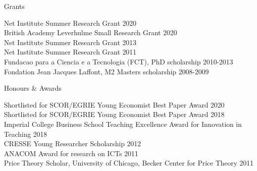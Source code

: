 \documentclass{resume}
\begin{document}


\begin{rSection}{Grants}

Net Institute Summer Research Grant \hfill {2020}
\\ British Academy Leverhulme Small Research Grant \hfill 2020
\\ Net Institute Summer Research Grant \hfill {2013}
\\ Net Institute Summer Research Grant \hfill {2011}
\\ Fundacao para a Ciencia e a Tecnologia (FCT), PhD scholarship \hfill {2010-2013}
\\ Fondation Jean Jacques Laffont, M2 Masters scholarship \hfill 2008-2009

\end{rSection}



\begin{rSection}{Honours \& Awards}

Shortlisted for SCOR/EGRIE Young Economist Best Paper Award \hfill 2020
\\ Shortlisted for SCOR/EGRIE Young Economist Best Paper Award \hfill 2018
\\Imperial College Business School Teaching Excellence Award for Innovation in Teaching \hfill 2018
\\ CRESSE Young Researcher Scholarship \hfill {2012}
\\ ANACOM Award for research on ICTs \hfill {2011}
\\ Price Theory Scholar, University of Chicago, Becker Center for Price Theory \hfill {2011}

\end{rSection}
\end{document}
